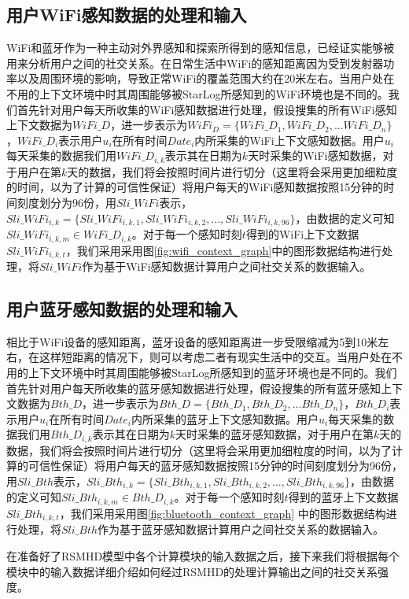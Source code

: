 \subsection{用户WiFi感知数据的处理和输入}
WiFi和蓝牙作为一种主动对外界感知和探索所得到的感知信息，已经证实能够被用来分析用户之间的社交关系。在日常生活中WiFi的感知距离因为受到发射器功率以及周围环境的影响，导致正常WiFi的覆盖范围大约在20米左右。当用户处在不用的上下文环境中时其周围能够被StarLog所感知到的WiFi环境也是不同的。我们首先针对用户每天所收集的WiFi感知数据进行处理，假设搜集的所有WiFi感知上下文数据为$WiFi\_D$，进一步表示为$WiFi_D=\{  WiFi\_D_{1},WiFi\_D_{2},...WiFi\_D_{n}  \}$，$WiFi\_D_{i}$表示用户$u_{i}$在所有时间$Date_{i}$内所采集的WiFi上下文感知数据。用户$u_{i}$每天采集的数据我们用$WiFi\_D_{i,k}$表示其在日期为$k$天时采集的WiFi感知数据，对于用户在第$k$天的数据，我们将会按照时间片进行切分（这里将会采用更加细粒度的时间，以为了计算的可信性保证）将用户每天的WiFi感知数据按照15分钟的时间刻度划分为96份，用$Sli\_WiFi$表示，$Sli\_WiFi_{i,k}=\{Sli\_WiFi_{i,k,1},Sli\_WiFi_{i,k,2},...,Sli\_WiFi_{i,k,96}\}$，由数据的定义可知$Sli\_WiFi_{i,k,m} \in WiFi\_D_{i,k}$。对于每一个感知时刻$t$得到的WiFi上下文数据$Sli\_WiFi_{i,k,t}$，我们采用采用图\ref{fig:wifi_context_graph}中的图形数据结构进行处理，将$Sli\_WiFi$作为基于WiFi感知数据计算用户之间社交关系的数据输入。

\subsection{用户蓝牙感知数据的处理和输入}
相比于WiFi设备的感知距离，蓝牙设备的感知距离进一步受限缩减为5到10米左右，在这样短距离的情况下，则可以考虑二者有现实生活中的交互。当用户处在不用的上下文环境中时其周围能够被StarLog所感知到的蓝牙环境也是不同的。我们首先针对用户每天所收集的蓝牙感知数据进行处理，假设搜集的所有蓝牙感知上下文数据为$Bth\_D$，进一步表示为$Bth\_D=\{Bth\_D_{1},Bth\_D_{2},...Bth\_D_{n} \}$，$Bth\_D_{i}$表示用户$u_{i}$在所有时间$Date_{i}$内所采集的蓝牙上下文感知数据。用户$u_{i}$每天采集的数据我们用$Bth\_D_{i,k}$表示其在日期为$k$天时采集的蓝牙感知数据，对于用户在第$k$天的数据，我们将会按照时间片进行切分（这里将会采用更加细粒度的时间，以为了计算的可信性保证）将用户每天的蓝牙感知数据按照15分钟的时间刻度划分为96份，用$Sli\_Bth$表示，$Sli\_Bth_{i,k}=\{Sli\_Bth_{i,k,1},Sli\_Bth_{i,k,2},...,Sli\_Bth_{i,k,96}\}$，由数据的定义可知$Sli\_Bth_{i,k,m} \in Bth\_D_{i,k}$。对于每一个感知时刻$t$得到的蓝牙上下文数据$Sli\_Bth_{i,k,t}$，我们采用采用图\ref{fig:bluetooth_context_graph} 中的图形数据结构进行处理，将$Sli\_Bth$作为基于蓝牙感知数据计算用户之间社交关系的数据输入。
\par 在准备好了RSMHD模型中各个计算模块的输入数据之后，接下来我们将根据每个模块中的输入数据详细介绍如何经过RSMHD的处理计算输出之间的社交关系强度。
